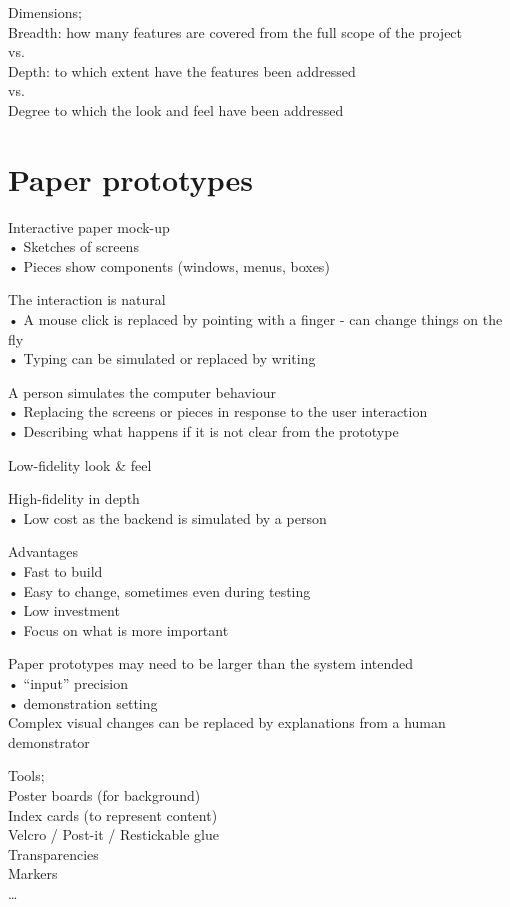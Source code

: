 \documentclass[]{project_plan}
\begin{document}
Dimensions;\\
Breadth: how many features are covered from the full scope of the project\\
vs.\\
Depth: to which extent have the features been addressed\\
vs.\\
Degree to which the look and feel have been addressed

\section{Paper prototypes}
Interactive paper mock-up\\
• Sketches of screens\\
• Pieces show components (windows, menus, boxes)

The interaction is natural\\
• A mouse click is replaced by pointing with a finger - can change things on the fly\\
• Typing can be simulated or replaced by writing

A person simulates the computer behaviour\\
• Replacing the screens or pieces in response to the user interaction\\
• Describing what happens if it is not clear from the prototype

Low-fidelity look \& feel

High-fidelity in depth\\
• Low cost as the backend is simulated by a person

Advantages\\
• Fast to build\\
• Easy to change, sometimes even during testing\\
• Low investment\\
• Focus on what is more important

Paper prototypes may need to be larger than the system intended\\
• “input” precision\\
• demonstration setting\\
Complex visual changes can be replaced by explanations from a human demonstrator

Tools;\\
Poster boards (for background)\\
Index cards (to represent content)\\
Velcro / Post-it / Restickable glue\\
Transparencies\\
Markers\\
…
\end{document}

